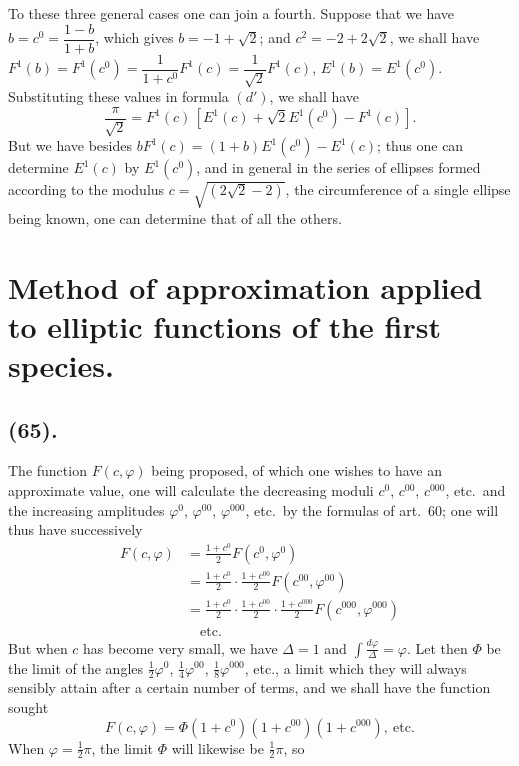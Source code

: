 \documentclass{article}
\begin{document}

To these three general cases one can join a fourth. Suppose that we have $b=c^{0}=\dfrac{1-b}{1+b}$, which gives $b=-1+\sqrt{2}$; and $c^{2}=-2+2\sqrt{2}$, we shall have $F^{1}(b)=F^{1}(c^{0})=\dfrac{1}{1+c^{0}}F^{1}(c)=\dfrac{1}{\sqrt{2}}F^{1}(c)$, $E^{1}(b)=E^{1}(c^{0})$. Substituting these values in formula $(d')$, we shall have
\[ \frac{\pi}{\sqrt{2}}=F^{1}(c)\,[E^{1}(c)+\sqrt{2}E^{1}(c^{0})-F^{1}(c)]. \]
But we have besides $bF^{1}(c)=(1+b)E^{1}(c^{0})-E^{1}(c)$; thus one can determine $E^{1}(c)$ by $E^{1}(c^{0})$, and in general in the series of ellipses formed according to the modulus $c=\sqrt{(2\sqrt{2}-2)}$, the circumference of a single ellipse being known, one can determine that of all the others.

\section*{Method of approximation applied to elliptic functions of the first species.}

\subsection*{(65).}

The function $F(c,\varphi)$ being proposed, of which one wishes to have an approximate value, one will calculate the decreasing moduli $c^{0}$, $c^{00}$, $c^{000}$, etc.\ and the increasing amplitudes $\varphi^{0}$, $\varphi^{00}$, $\varphi^{000}$, etc.\ by the formulas of art.~60; one will thus have successively
\[ \begin{aligned} F(c,\varphi)&=\frac{1+c^{0}}{2}F(c^{0},\varphi^{0})\\ &=\frac{1+c^{0}}{2}\cdot\frac{1+c^{00}}{2}F(c^{00},\varphi^{00})\\ &=\frac{1+c^{0}}{2}\cdot\frac{1+c^{00}}{2}\cdot\frac{1+c^{000}}{2}F(c^{000},\varphi^{000})\\ &\quad\text{etc.} \end{aligned} \]
But when $c$ has become very small, we have $\Delta=1$ and $\displaystyle\int\frac{d\varphi}{\Delta}=\varphi$. Let then $\Phi$ be the limit of the angles $\frac{1}{2}\varphi^{0}$, $\frac{1}{4}\varphi^{00}$, $\frac{1}{8}\varphi^{000}$, etc., a limit which they will always sensibly attain after a certain number of terms, and we shall have the function sought
\[ F(c,\varphi)=\Phi(1+c^{0})(1+c^{00})(1+c^{000}),\ \text{etc.} \]
When $\varphi=\frac{1}{2}\pi$, the limit $\Phi$ will likewise be $\frac{1}{2}\pi$, so
\end{document}
